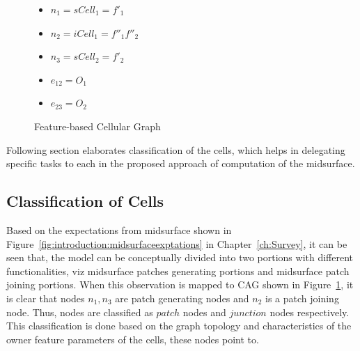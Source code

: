 \begin{figure}[!h]
\begin{minipage}[h]{0.22\linewidth}
\end{minipage}\hfill
\begin{minipage}[h]{0.38\linewidth} 
\begin{itemize}[noitemsep,topsep=2pt,parsep=2pt,partopsep=2pt]
\item $n_1 = sCell_1= f'_1$
\item $n_2 = iCell_1 = f''_1f''_2$
\item $n_3 = sCell_2 = f'_2$
\item $e_{12} = O_1$
\item $e_{23}= O_2$
\end{itemize}
\end{minipage}
\caption{Feature-based Cellular Graph}
\label{fig:midsurfcelljoin:featgraph}
\end{figure}



Following section elaborates classification of the cells, which helps in delegating specific tasks to each in the proposed approach of computation of the midsurface.

\subsection{Classification of Cells} \label{sec:midsurfcelljoin:classfication}

Based on the expectations from midsurface shown in Figure~\ref{fig:introduction:midsurfaceexptations} in Chapter~\ref{ch:Survey}, it can be seen that, the model can be conceptually divided into two portions with different functionalities, viz midsurface patches generating portions and midsurface patch joining portions. When this observation is mapped to CAG shown in Figure~\ref{fig:midsurfcelljoin:featgraph}, it is clear that nodes $n_1, n_3$ are patch generating nodes and $n_2$ is a patch joining node. Thus, nodes are classified as $patch$ nodes and $junction$ nodes respectively. This classification is done based on the graph topology and characteristics of the owner feature parameters of the cells, these nodes point to.


